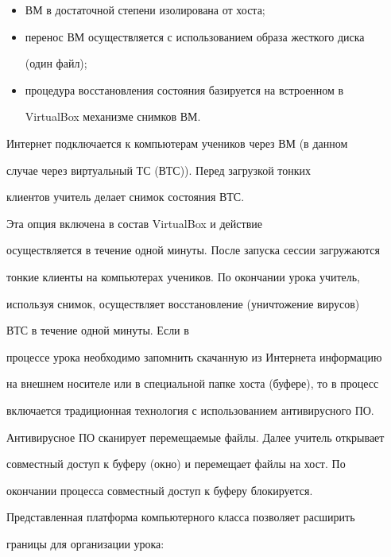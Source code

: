 \begin{itemize}


\item  ВМ в достаточной степени изолирована от хоста;


\item  перенос ВМ осуществляется с использованием образа жесткого диска 


(один файл);


\item процедура восстановления состояния базируется на встроенном в 


VirtualBox механизме снимков ВМ.


\end{itemize}





    Интернет подключается к компьютерам учеников через ВМ (в данном 


случае через виртуальный ТС (ВТС)). Перед загрузкой тонких 


клиентов учитель делает снимок состояния ВТС. 


Эта опция включена в состав VirtualBox и действие 


осуществляется в течение одной минуты. После запуска сессии загружаются 


тонкие клиенты на компьютерах учеников. По окончании урока учитель, 


используя снимок, осуществляет вос\-ста\-нов\-ле\-ние (уничтожение вирусов) 


ВТС в течение одной минуты. Если в 


процессе урока необходимо запомнить скачанную из Интернета информацию 


на внешнем носителе или в специальной папке хоста (буфере), то в процесс 


включается традиционная технология с использованием антивирусного ПО. 


Антивирусное ПО сканирует перемещаемые файлы. Далее учитель открывает 


совместный доступ к буферу (окно) и перемещает файлы на хост. По 


окончании процесса совместный доступ к буферу блокируется.





Представленная платформа компьютерного класса позволяет расширить 


границы для организации урока:


